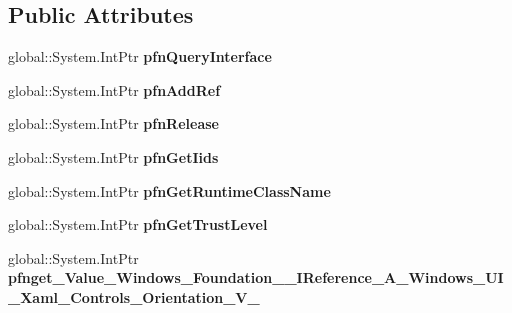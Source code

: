 \subsection*{Public Attributes}
\begin{DoxyCompactItemize}
\item 
\mbox{\label{struct_system_1_1_nullable___a___windows___u_i___xaml___controls___orientation___v_______impl_1_1_vtbl_a783d03309ed56230e34b6e47bc5002ab}} 
global\+::\+System.\+Int\+Ptr {\bfseries pfn\+Query\+Interface}
\item 
\mbox{\label{struct_system_1_1_nullable___a___windows___u_i___xaml___controls___orientation___v_______impl_1_1_vtbl_a49769c656c3567beb1128f5730e53cc3}} 
global\+::\+System.\+Int\+Ptr {\bfseries pfn\+Add\+Ref}
\item 
\mbox{\label{struct_system_1_1_nullable___a___windows___u_i___xaml___controls___orientation___v_______impl_1_1_vtbl_ae368ba191d46c619a5284a4708968a3e}} 
global\+::\+System.\+Int\+Ptr {\bfseries pfn\+Release}
\item 
\mbox{\label{struct_system_1_1_nullable___a___windows___u_i___xaml___controls___orientation___v_______impl_1_1_vtbl_a98680bc822b9f918e169bc0e9ab0e976}} 
global\+::\+System.\+Int\+Ptr {\bfseries pfn\+Get\+Iids}
\item 
\mbox{\label{struct_system_1_1_nullable___a___windows___u_i___xaml___controls___orientation___v_______impl_1_1_vtbl_a03fb10ce38b392196a4a036fcb95a8ec}} 
global\+::\+System.\+Int\+Ptr {\bfseries pfn\+Get\+Runtime\+Class\+Name}
\item 
\mbox{\label{struct_system_1_1_nullable___a___windows___u_i___xaml___controls___orientation___v_______impl_1_1_vtbl_aa83910af1108199f4792113701fa7fdd}} 
global\+::\+System.\+Int\+Ptr {\bfseries pfn\+Get\+Trust\+Level}
\item 
\mbox{\label{struct_system_1_1_nullable___a___windows___u_i___xaml___controls___orientation___v_______impl_1_1_vtbl_a84bede6dc6596d789a7fcdb29c603374}} 
global\+::\+System.\+Int\+Ptr {\bfseries pfnget\+\_\+\+Value\+\_\+\+Windows\+\_\+\+Foundation\+\_\+\+\_\+\+I\+Reference\+\_\+\+A\+\_\+\+Windows\+\_\+\+U\+I\+\_\+\+Xaml\+\_\+\+Controls\+\_\+\+Orientation\+\_\+\+V\+\_\+}
\end{DoxyCompactItemize}
